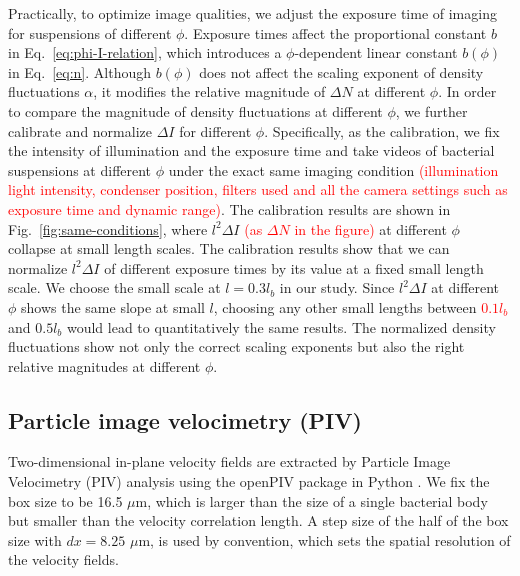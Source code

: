 \documentclass[twocolumn,aps,prx,amsmath,amssymb,longbibliography,superscriptaddress]{revtex4-2}
\begin{document}
Practically, to optimize image qualities, we adjust the exposure time of imaging for suspensions of different $\phi$. Exposure times affect the proportional constant $b$ in Eq.~\ref{eq:phi-I-relation}, which introduces a $\phi$-dependent linear constant $b(\phi)$ in Eq.~\ref{eq:n}. Although $b(\phi)$ does not affect the scaling exponent of density fluctuations $\alpha$, it modifies the relative magnitude of $\Delta N$ at different $\phi$. In order to compare the magnitude of density fluctuations at different $\phi$,  we further calibrate and normalize $\Delta I$ for different $\phi$. Specifically, as the calibration, we fix the intensity of illumination and the exposure time and take videos of bacterial suspensions at different $\phi$ under the exact same imaging condition \textcolor{red}{(illumination light intensity, condenser position, filters used and all the camera settings such as exposure time and dynamic range)}. The calibration results are shown in Fig.~\ref{fig:same-conditions}, where $l^2 \Delta I$ \textcolor{red}{(as $\Delta N$ in the figure)} at different $\phi$ collapse at small length scales. The calibration results show that we can normalize $l^2 \Delta I$ of different exposure times by its value at a fixed small length scale. We choose the small scale at $l = 0.3l_b$ in our study. Since $l^2 \Delta I$ at different $\phi$ shows the same slope at small $l$, choosing any other small lengths between \textcolor{red}{$0.1l_b$} and $0.5l_b$ would lead to quantitatively the same results. The normalized density fluctuations show not only the correct scaling exponents but also the right relative magnitudes at different $\phi$.


\subsection{Particle image velocimetry (PIV)} \label{appendix-IA-PIV}

Two-dimensional in-plane velocity fields are extracted by Particle Image Velocimetry (PIV) analysis using the openPIV package in Python \cite{Liberzon2020}. We fix the box size to be 16.5 $\mu$m, which is larger than the size of a single bacterial body but smaller than the velocity correlation length. A step size of the half of the box size with $dx = 8.25$ $\mu$m, is used by convention, which sets the spatial resolution of the velocity fields.
\end{document}
